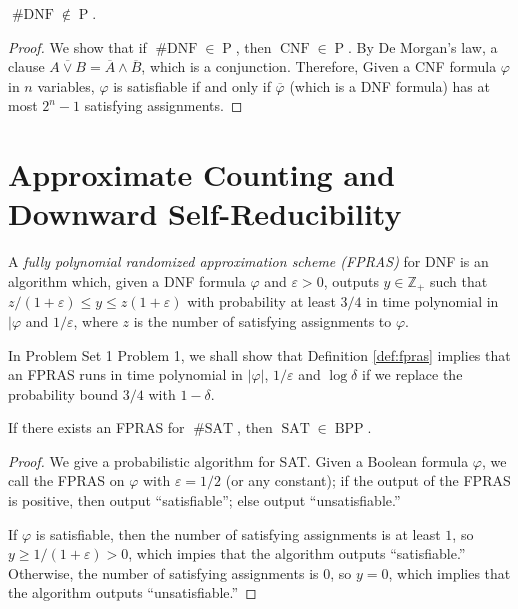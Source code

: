 \documentclass[letterpaper, reqno,11pt]{article}
\newcommand{\ZZ}{\mathbb{Z}}
\DeclareMathOperator{\shSAT}{\# SAT}
\DeclareMathOperator{\shDNF}{\# DNF}
\DeclareMathOperator{\Poly}{P}
\DeclareMathOperator{\CNF}{CNF}
\DeclareMathOperator{\SAT}{SAT}
\DeclareMathOperator{\BPP}{BPP}
\begin{document}
\begin{proposition}
  $\shDNF \not \in \Poly$.
\end{proposition}

\begin{proof}
  We show that if $\shDNF \in \Poly$, then $\CNF \in \Poly$. By De Morgan's law, a clause $\overline{A \vee B} = \overline{A} \wedge \overline{B}$, which is a conjunction. Therefore, Given a CNF formula $\varphi$ in $n$ variables, $\varphi$ is satisfiable if and only if $\overline \varphi$ (which is a DNF formula) has at most $2^n - 1$ satisfying assignments.
\end{proof}

\section{Approximate Counting and Downward Self-Reducibility} \label{sec:approx-counting}

\begin{definition} \label{def:fpras}
  A \emph{fully polynomial randomized approximation scheme (FPRAS)} for DNF is an algorithm which, given a DNF formula $\varphi$ and $\varepsilon > 0$, outputs $y \in \ZZ_+$ such that $z/(1 + \varepsilon) \leq y \leq z(1 + \varepsilon)$ with probability at least $3/4$ in time polynomial in $|\varphi$ and $1/\varepsilon$, where $z$ is the number of satisfying assignments to $\varphi$.
\end{definition}

In Problem Set 1 Problem 1, we shall show that Definition \ref{def:fpras} implies that an FPRAS runs in time polynomial in $|\varphi|$, $1/\varepsilon$ and $\log \delta$ if we replace the probability bound $3/4$ with $1 - \delta$.

\begin{proposition}
  If there exists an FPRAS for $\shSAT$, then $\SAT \in \BPP$.
\end{proposition}

\begin{proof}
  We give a probabilistic algorithm for SAT. Given a Boolean formula $\varphi$, we call the FPRAS on $\varphi$ with $\varepsilon = 1/2$ (or any constant); if the output of the FPRAS is positive, then output ``satisfiable''; else output ``unsatisfiable.''

  If $\varphi$ is satisfiable, then the number of satisfying assignments is at least $1$, so $y \geq 1/(1 + \varepsilon) > 0$, which impies that the algorithm outputs ``satisfiable.'' Otherwise, the number of satisfying assignments is $0$, so $y = 0$, which implies that the algorithm outputs ``unsatisfiable.''
\end{proof}
\end{document}
